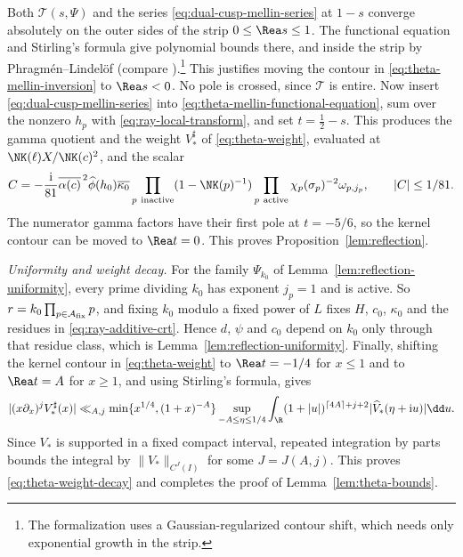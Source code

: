 Both $\mathcal T(s,\Psi)$ and the series \eqref{eq:dual-cusp-mellin-series} at $1-s$ converge
absolutely on the outer sides of the strip $0\le\Rea s\le1$. The functional equation and
Stirling's formula give polynomial bounds there, and inside the strip by
Phragm\'en--Lindel\"of (compare \cite[Propositions~5.1--5.2]{DR}).\footnote{The formalization
uses a Gaussian-regularized contour shift, which needs only exponential growth in the strip.}
This justifies moving the contour in \eqref{eq:theta-mellin-inversion} to $\Rea s<0$. No pole is
crossed, since $\mathcal T$ is entire. Now insert \eqref{eq:dual-cusp-mellin-series} into
\eqref{eq:theta-mellin-functional-equation}, sum over the nonzero $h_p$ with
\eqref{eq:ray-local-transform}, and set $t=\tfrac12-s$. This produces the gamma quotient and
the weight $V_*^\sharp$ of \eqref{eq:theta-weight}, evaluated at $\NK(\ell)X/\NK(c)^2$, and the
scalar
\[
 C=-\frac{\mathrm i}{81}\overline{\alpha(c)}^{\,2}
 \widehat\phi(h_0)\overline{\kappa_0}
 \prod_{p\ {\rm inactive}}(1-\NK(p)^{-1})
 \prod_{p\ {\rm active}}\chi_p(\sigma_p)^{-2}\omega_{p,j_p},
 \qquad |C|\le1/81 .
\]
The numerator gamma factors have their first pole at $t=-5/6$, so the kernel contour can be moved
to $\Rea t=0$. This proves Proposition~\ref{lem:reflection}.

\emph{Uniformity and weight decay.} For the family $\Psi_{k_0}$ of
Lemma~\ref{lem:reflection-uniformity}, every prime dividing $k_0$ has exponent $j_p=1$ and is
active. So $r=k_0\prod_{p\in\mathcal A_{\rm fix}}p$, and fixing $k_0$ modulo a fixed power of $L$
fixes $H$, $c_0$, $\kappa_0$ and the residues in \eqref{eq:ray-additive-crt}. Hence $d$, $\psi$
and $c_0$ depend on $k_0$ only through that residue class, which is
Lemma~\ref{lem:reflection-uniformity}. Finally, shifting the kernel contour in
\eqref{eq:theta-weight} to $\Rea t=-1/4$ for $x\le1$ and to $\Rea t=A$ for $x\ge1$, and using
Stirling's formula, gives
\begin{equation}\label{eq:ray-kernel}
|(x\partial_x)^jV_*^\sharp(x)|
 \ll_{A,j}\min\{x^{1/4},(1+x)^{-A}\}
 \sup_{-A\le\eta\le1/4}\int_{\R}
 (1+|u|)^{\lceil4A\rceil+j+2}|\widehat V_*(\eta+\mathrm i u)|\dd u.
\end{equation}
Since $V_*$ is supported in a fixed compact interval, repeated integration by parts bounds the
integral by $\|V_*\|_{C^J(I)}$ for some $J=J(A,j)$. This proves \eqref{eq:theta-weight-decay}
and completes the proof of Lemma~\ref{lem:theta-bounds}.
